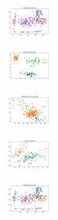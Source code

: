 \begin{figure}[H]
    \hfill
    \begin{subfigure}
        \centering
        \includegraphics[width=0.234\textwidth]{img/copkm2/ecoli_set_const_20_589741062_clust.png}
    \end{subfigure}
    \hfill
    \begin{subfigure}
        \centering
        \includegraphics[width=0.234\textwidth]{img/copkm2/rand_set_const_20_589741062_clust.png}
    \end{subfigure}
    \hfill
    \begin{subfigure}
        \centering
        \includegraphics[width=0.234\textwidth]{img/copkm2/newthyroid_set_const_20_589741062_clust.png}
    \end{subfigure}
    \hfill
    \begin{subfigure}
        \centering
        \includegraphics[width=0.234\textwidth]{img/copkm2/iris_set_const_20_277451237_clust.png}
    \end{subfigure}
    \hfill
    \begin{subfigure}
        \centering
        \includegraphics[width=0.234\textwidth]{img/copkm2/ecoli_set_const_20_277451237_clust.png}
    \end{subfigure}
    \hfill
    \begin{subfigure}

\end{subfigure}
\end{figure}
